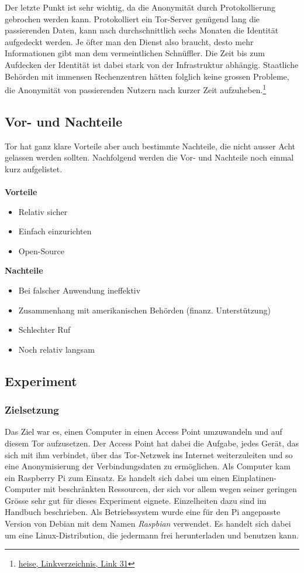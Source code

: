 Der letzte Punkt ist sehr wichtig, da die Anonymität durch Protokollierung gebrochen werden kann. Protokolliert ein Tor-Server genügend lang die passierenden Daten, kann nach durchschnittlich sechs Monaten die Identität aufgedeckt werden. Je öfter man den Dienst also braucht, desto mehr Informationen gibt man dem vermeintlichen Schnüffler. Die Zeit bis zum Aufdecken der Identität ist dabei stark von der Infrastruktur abhängig. Staatliche Behörden mit immensen Rechenzentren hätten folglich keine grossen Probleme, die Anonymität von passierenden Nutzern nach kurzer Zeit aufzuheben.\footnote{\hyperlink{link31}{heise, Linkverzeichnis, Link 31}}

\subsection{Vor- und Nachteile}
Tor hat ganz klare Vorteile aber auch bestimmte Nachteile, die nicht ausser Acht gelassen werden sollten.
Nachfolgend werden die Vor- und Nachteile noch einmal kurz aufgelistet.
\\
\\

\textbf{Vorteile}
\begin{itemize}
\item Relativ sicher
\item Einfach einzurichten
\item Open-Source
\end{itemize}

\textbf{Nachteile}
\begin{itemize}
\item Bei falscher Anwendung ineffektiv
\item Zusammenhang mit amerikanischen Behörden (finanz. Unterstützung)
\item Schlechter Ruf
\item Noch relativ langsam
\end{itemize}

\subsection{Experiment}

\subsubsection{Zielsetzung}
Das Ziel war es, einen Computer in einen Access Point umzuwandeln und auf diesem Tor aufzusetzen.
Der Access Point hat dabei die Aufgabe, jedes Gerät, das sich mit ihm verbindet, über das Tor-Netzwek ins Internet weiterzuleiten und so eine Anonymisierung der Verbindungsdaten zu ermöglichen.
Als Computer kam ein Raspberry Pi zum Einsatz.
Es handelt sich dabei um einen Einplatinen-Computer mit beschränkten Ressourcen, der sich vor allem wegen seiner geringen Grösse sehr gut für dieses Experiment eignete.
Einzelheiten dazu sind im Handbuch beschrieben.
Als Betriebssystem wurde eine für den Pi angepasste Version von Debian mit dem Namen \textit{Raspbian} verwendet.
Es handelt sich dabei um eine Linux-Distribution, die jedermann frei herunterladen und benutzen kann.

